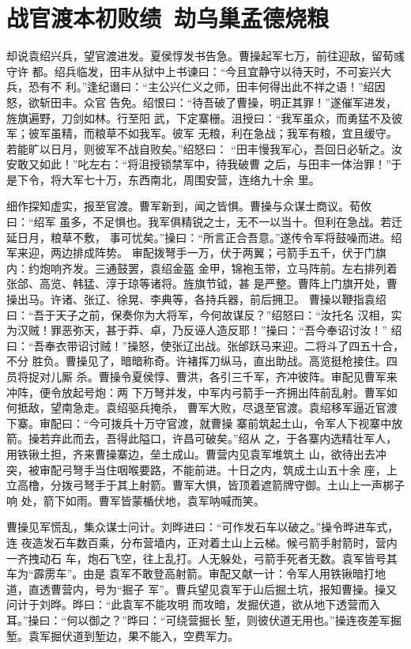 \chapter{战官渡本初败绩~劫乌巢孟德烧粮}

却说袁绍兴兵，望官渡进发。夏侯惇发书告急。曹操起军七万，前往迎敌，留荀彧守许
都。绍兵临发，田丰从狱中上书谏曰：“今且宜静守以待天时，不可妄兴大兵，恐有不
利。”逢纪谮曰：“主公兴仁义之师，田丰何得出此不祥之语！”绍因怒，欲斩田丰。众官
告免。绍恨曰：“待吾破了曹操，明正其罪！”遂催军进发，旌旗遍野，刀剑如林。行至阳
武，下定寨栅。沮授曰：“我军虽众，而勇猛不及彼军；彼军虽精，而粮草不如我军。彼军
无粮，利在急战；我军有粮，宜且缓守。若能旷以日月，则彼军不战自败矣。”绍怒曰：
“田丰慢我军心，吾回日必斩之。汝安敢又如此！”叱左右：“将沮授锁禁军中，待我破曹
之后，与田丰一体治罪！”于是下令，将大军七十万，东西南北，周围安营，连络九十余
里。

细作探知虚实，报至官渡。曹军新到，闻之皆惧。曹操与众谋士商议。荀攸曰：“绍军
虽多，不足惧也。我军俱精锐之士，无不一以当十。但利在急战。若迁延日月，粮草不敷，
事可忧矣。”操曰：“所言正合吾意。”遂传令军将鼓噪而进。绍军来迎，两边排成阵势。
审配拨弩手一万，伏于两翼；弓箭手五千，伏于门旗内：约炮响齐发。三通鼓罢，袁绍金盔
金甲，锦袍玉带，立马阵前。左右排列着张郃、高览、韩猛、淳于琼等诸将。旌旗节钺，甚
是严整。曹阵上门旗开处，曹操出马。许诸、张辽、徐晃、李典等，各持兵器，前后拥卫。
曹操以鞭指袁绍曰：“吾于天子之前，保奏你为大将军，今何故谋反？”绍怒曰：“汝托名
汉相，实为汉贼！罪恶弥天，甚于莽、卓，乃反诬人造反耶！”操曰：“吾今奉诏讨汝！”
绍曰：“吾奉衣带诏讨贼！”操怒，使张辽出战。张邰跃马来迎。二将斗了四五十合，不分
胜负。曹操见了，暗暗称奇。许褚挥刀纵马，直出助战。高览挺枪接住。四员将捉对儿厮
杀。曹操令夏侯惇、曹洪，各引三千军，齐冲彼阵。审配见曹军来冲阵，便令放起号炮：两
下万弩并发，中军内弓箭手一齐拥出阵前乱射。曹军如何抵敌，望南急走。袁绍驱兵掩杀，
曹军大败，尽退至官渡。袁绍移军逼近官渡下寨。审配曰：“今可拨兵十万守官渡，就曹操
寨前筑起土山，令军人下视寨中放箭。操若弃此而去，吾得此隘口，许昌可破矣。”绍从
之，于各寨内选精壮军人，用铁锹土担，齐来曹操寨边，垒土成山。曹营内见袁军堆筑土
山，欲待出去冲突，被审配弓弩手当住咽喉要路，不能前进。十日之内，筑成土山五十余
座，上立高橹，分拨弓弩手于其上射箭。曹军大惧，皆顶着遮箭牌守御。土山上一声梆子响
处，箭下如雨。曹军皆蒙楯伏地，袁军呐喊而笑。

曹操见军慌乱，集众谋士问计。刘晔进曰：“可作发石车以破之。”操令晔进车式，连
夜造发石车数百乘，分布营墙内，正对着土山上云梯。候弓箭手射箭时，营内一齐拽动石
车，炮石飞空，往上乱打。人无躲处，弓箭手死者无数。袁军皆号其车为“霹雳车”。由是
袁军不敢登高射箭。审配又献一计：令军人用铁锹暗打地道，直透曹营内，号为“掘子
军”。曹兵望见袁军于山后掘土坑，报知曹操。操又问计于刘晔。晔曰：“此袁军不能攻明
而攻暗，发掘伏道，欲从地下透营而入耳。”操曰：“何以御之？”晔曰：“可绕营掘长
堑，则彼伏道无用也。”操连夜差军掘堑。袁军掘伏道到堑边，果不能入，空费军力。

